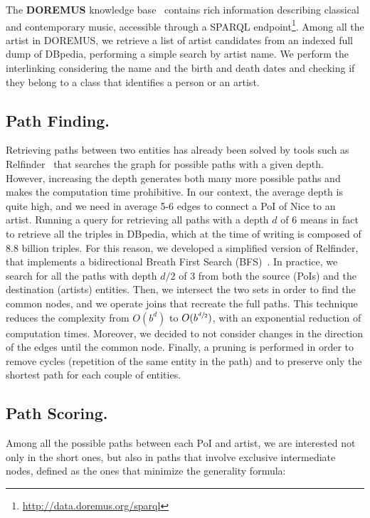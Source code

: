 \documentclass{llncs}
\begin{document}
The \textbf{DOREMUS} knowledge base~\cite{achichi2015doremus} contains rich information describing classical and contemporary music, accessible through a SPARQL endpoint\footnote{\url{http://data.doremus.org/sparql}}. Among all the artist in DOREMUS, we retrieve a list of artist candidates from an indexed full dump of DBpedia, performing a simple search by artist name. We perform the interlinking considering the name and the birth and death dates and checking if they belong to a class that identifies a person or an artist.


\subsection*{Path Finding.}
Retrieving paths between two entities has already been solved by tools such as Relfinder~\cite{heim2009relfinder} that searches the graph for possible paths with a given depth. However, increasing the depth generates both many more possible paths and makes the computation time prohibitive. In our context, the average depth is quite high, and we need in average 5-6 edges to connect a PoI of Nice to an artist. Running a query for retrieving all paths with a depth $d$ of 6 means in fact to retrieve all the triples in DBpedia, which at the time of writing is composed of 8.8 billion triples. For this reason, we developed a simplified version of Relfinder, that implements a bidirectional Breath First Search (BFS)~\cite{russell1995modern}. In practice, we search for all the paths with depth $d/2$ of 3 from both the source (PoIs) and the destination (artists) entities. Then, we intersect the two sets in order to find the common nodes, and we operate joins that recreate the full paths. This technique reduces the complexity from $O(b^d)$ to $O(b^{\sfrac{d}{2}})$, with an exponential reduction of computation times. Moreover, we decided to not consider changes in the direction of the edges until the common node. Finally, a pruning is performed in order to remove cycles (repetition of the same entity in the path) and to preserve only the shortest path for each couple of entities.

\subsection*{Path Scoring.}
Among all the possible paths between each PoI and artist, we are interested not only in the short ones, but also in paths that involve exclusive intermediate nodes, defined as the ones that minimize the generality formula:
\end{document}
